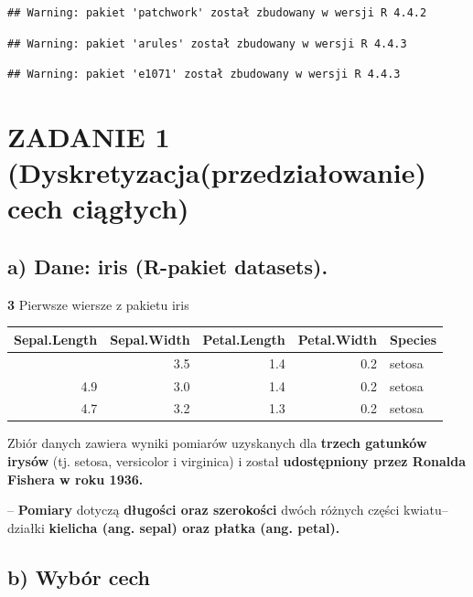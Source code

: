 \documentclass[
  12pt,
]{article}
\begin{document}
\begin{verbatim}
## Warning: pakiet 'patchwork' został zbudowany w wersji R 4.4.2
\end{verbatim}

\begin{verbatim}
## Warning: pakiet 'arules' został zbudowany w wersji R 4.4.3
\end{verbatim}

\begin{verbatim}
## Warning: pakiet 'e1071' został zbudowany w wersji R 4.4.3
\end{verbatim}

\section{ZADANIE 1 (Dyskretyzacja(przedziałowanie) cech
ciągłych)}\label{zadanie-1-dyskretyzacjaprzedziaux142owanie-cech-ciux105gux142ych}

\subsection{a) Dane: iris (R-pakiet
datasets).}\label{a-dane-iris-r-pakiet-datasets.}

\textbf{3} Pierwsze wiersze z pakietu iris

\begin{longtable}[]{@{}rrrrl@{}}
\toprule\noalign{}
Sepal.Length & Sepal.Width & Petal.Length & Petal.Width & Species \\
\midrule\noalign{}
\endhead
\bottomrule\noalign{}
\endlastfoot
5.1 & 3.5 & 1.4 & 0.2 & setosa \\
4.9 & 3.0 & 1.4 & 0.2 & setosa \\
4.7 & 3.2 & 1.3 & 0.2 & setosa \\
\end{longtable}

Zbiór danych zawiera wyniki pomiarów uzyskanych dla \textbf{trzech
gatunków irysów} (tj. setosa, versicolor i virginica) i został
\textbf{udostępniony przez Ronalda Fishera w roku 1936.}

-- \textbf{Pomiary} dotyczą \textbf{długości oraz szerokości} dwóch
różnych części kwiatu-- działki \textbf{kielicha (ang. sepal) oraz
płatka (ang. petal).}

\subsection{b) Wybór cech}\label{b-wybuxf3r-cech}
\end{document}
